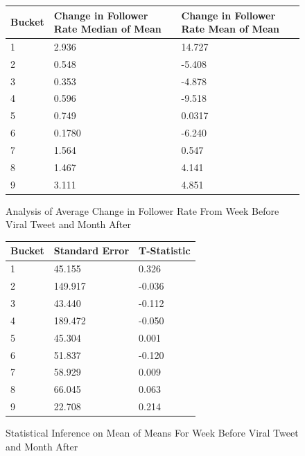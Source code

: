 \documentclass[twoside,twocolumn]{article}
\begin{document}
\begin{center}
\begin{figure}[H]
\begin{tabular}{ | m{1.5cm} | m{2cm} |m{2cm} | } 
  \hline
    Bucket  & Change in Follower Rate Median of Mean & Change in Follower Rate Mean of Mean \\ 
  \hline
  1 & 2.936 & 14.727  \\ 
  \hline
  2 & 0.548 & -5.408  \\  
  \hline
  3 & 0.353 & -4.878  \\ 
  \hline
  4 & 0.596 & -9.518  \\  
  \hline
  5 & 0.749 & 0.0317  \\ 
  \hline
  6 & 0.1780 & -6.240  \\  
  \hline
  7 & 1.564 & 0.547  \\ 
  \hline
  8 & 1.467 & 4.141  \\  
  \hline
  9 & 3.111 & 4.851  \\  
  \hline
\end{tabular}
\caption{Analysis of Average Change in Follower Rate From Week Before Viral Tweet and Month After}
\end{figure}

\begin{figure}[H]
\begin{tabular}{ | m{1.5cm} | m{2cm} |m{2cm} | } 
  \hline
    Bucket  &  Standard Error & T-Statistic\\ 
  \hline
  1 & 45.155 & 0.326  \\ 
  \hline
  2 & 149.917 & -0.036  \\  
  \hline
  3 & 43.440 & -0.112  \\ 
  \hline
  4 & 189.472 & -0.050  \\  
  \hline
  5 & 45.304 & 0.001  \\ 
  \hline
  6 & 51.837 & -0.120  \\  
  \hline
  7 & 58.929 & 0.009 \\ 
  \hline
  8 & 66.045 & 0.063  \\  
  \hline
  9 & 22.708 & 0.214  \\  
  \hline
\end{tabular}
\caption{Statistical Inference on Mean of Means For Week Before Viral Tweet and Month After}
\end{figure}
\end{center}
\end{document}
